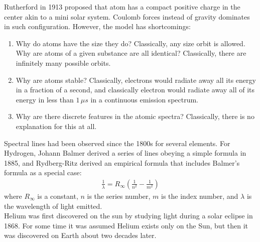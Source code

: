 \documentclass[11pt]{article}
\theoremstyle{break}
\theoremstyle{break}
\begin{document}
Rutherford in 1913 proposed that atom has a compact positive charge in the center akin to a mini solar system. Coulomb forces instead of gravity dominates in such configuration. However, the model has shortcomings:
\begin{enumerate}
\item Why do atoms have the size they do?
Classically, any size orbit is allowed.
Why are atoms of a given substance are all identical? Classically, there are infinitely many possible orbits.
\item Why are atoms stable? Classically, electrons would radiate away all its energy in a fraction of a second, and classically electron would radiate away all of its energy in less than $1\, \mu s$ in a continuous emission spectrum.
\item Why are there discrete features in the atomic spectra? Classically, there is no explanation for this at all. 
\end{enumerate}


Spectral lines had been observed since the 1800s for several elements. For Hydrogen, Johann Balmer derived a series of lines obeying a simple formula in 1885, and Rydberg-Ritz derived an empirical formula that includes Balmer's formula as a special case:
\begin{align*}
\frac{1}{\lambda} = R_{\infty}\left( \frac{1}{n^2} - \frac{1}{m^2}\right)
\end{align*}
where $R_{\infty}$ is a constant, $n$ is the series number, $m$ is the index number, and $\lambda $ is the wavelength of light emitted.\\

Helium was first discovered on the sun by studying light during a solar eclipse in 1868. For some time it was assumed Helium exists only on the Sun, but then it was discovered on Earth about two decades later.\\
\end{document}
